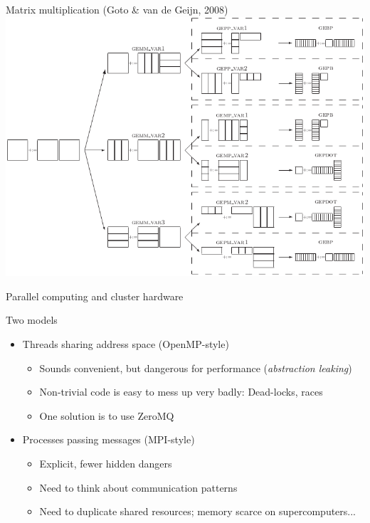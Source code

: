\documentclass[sans,mathserif]{beamer}
\begin{document}
\begin{frame}{Matrix multiplication (Goto \& van de Geijn, 2008)}
\includegraphics[width=\textwidth]{goto_matmul.png}  
\end{frame}

\begin{frame}
  \begin{center}
    {\Large Parallel computing and cluster hardware}
  \end{center}
\end{frame}

\begin{frame}{Two models}
    \begin{itemize}
    \item<+-> Threads sharing address space (OpenMP-style)
      \begin{itemize}
      \item<+-> Sounds convenient, but dangerous for performance ({\em abstraction leaking})
      \item<+-> Non-trivial code is easy to mess up very badly:
        Dead-locks, races
      \item<+-> One solution is to use ZeroMQ
      \end{itemize}
    \item<+-> Processes passing messages (MPI-style)
      \begin{itemize}
      \item<+-> Explicit, fewer hidden dangers
      \item<+-> Need to think about communication patterns
      \item<+-> Need to duplicate shared resources; memory scarce on supercomputers...
      \end{itemize}
    \end{itemize}

\end{frame}
\end{document}
